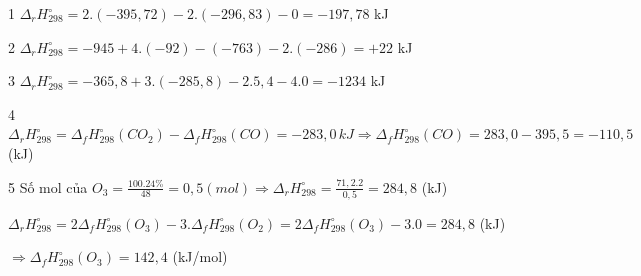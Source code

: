 \def\writeANS{\faKey\protect \, \TLsai{A}\TLsai{B}\TLsai{C}\TLdung{D}}
\def\writeANS{\faKey\protect \, \protect \circlenum {B}}
\begin{loigiaiex}{1}
  $\Delta _r H_{298}^\circ = 2.(-395{,}72) - 2.(-296{,}83) - 0 = -197{,}78$ kJ
\end{loigiaiex}
\def\writeANS{\faKey\protect \, \TLsai{A}\TLsai{B}\TLsai{C}\TLdung{D}}
\def\writeANS{\faKey\protect \, \protect \circlenum {A}}
\begin{loigiaiex}{2}
  $\Delta _r H_{298}^\circ = -945 + 4.(-92) - (-763) - 2.(-286) = +22$ kJ
\end{loigiaiex}
\def\writeANS{\faKey\protect \, \TLsai{A}\TLsai{B}\TLsai{C}\TLdung{D}}
\def\writeANS{\faKey\protect \, \protect \circlenum {D}}
\begin{loigiaiex}{3}
  $\Delta _r H_{298}^\circ = -365{,}8 + 3.(-285{,}8) - 2.5{,}4 - 4.0 = -1234$ kJ
\end{loigiaiex}
\def\writeANS{\faKey\protect \, \TLsai{A}\TLsai{B}\TLsai{C}\TLdung{D}}
\def\writeANS{\faKey\protect \, \protect \circlenum {A}}
\begin{loigiaiex}{4}
  $\Delta _r H_{298}^\circ = \Delta _f H_{298}^\circ (CO_2) - \Delta _f H_{298}^\circ (CO) = -283{,}0 \, kJ \Rightarrow \Delta _f H_{298}^\circ (CO) = 283{,}0 - 395{,}5 = -110{,}5$ (kJ)
\end{loigiaiex}
\def\writeANS{\faKey\protect \, \TLsai{A}\TLsai{B}\TLsai{C}\TLdung{D}}
\def\writeANS{\faKey\protect \, \protect \circlenum {A}}
\begin{loigiaiex}{5}
  Số mol của $O_3 = \frac {100.24\%}{48} = 0{,}5 (mol) \Rightarrow \Delta _r H_{298}^\circ = \frac {71{,}2.2}{0{,}5} = 284{,}8$ (kJ) \par $\Delta _r H_{298}^\circ = 2\Delta _f H_{298}^\circ (O_3) - 3.\Delta _f H_{298}^\circ (O_2) = 2\Delta _f H_{298}^\circ (O_3) - 3.0 = 284{,}8$ (kJ) \par $\Rightarrow \Delta _f H_{298}^\circ (O_3) = 142{,}4$ (kJ/mol)
\end{loigiaiex}

